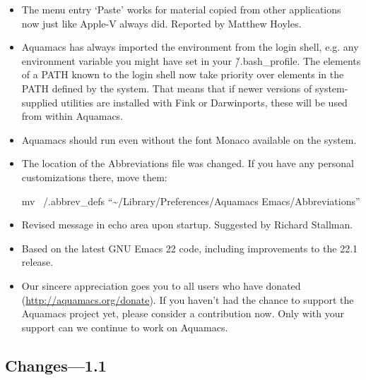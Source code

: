 \begin{itemize}
\item The menu entry `Paste' works for material copied from other
  applications now just like Apple-V always did. 
Reported by Matthew Hoyles.

\item Aquamacs has always imported the environment from the login
  shell, e.g. any environment variable you might have set in your
  \~/.bash\_profile. The elements of a PATH known to the login shell now
  take priority over elements in the PATH defined by the system. That
  means that if newer versions of system-supplied utilities are
  installed with Fink or Darwinports, these will be used from within
  Aquamacs.

\item Aquamacs should run even without the font Monaco available on the system.

\item The location of the Abbreviations file was changed. If you have any personal customizations there, move them:

mv ~/.abbrev\_defs ``{\textasciitilde{}}/Library/Preferences/Aquamacs Emacs/Abbreviations''

\item Revised message in echo area upon startup.
Suggested by Richard Stallman.

\item Based on the latest GNU Emacs 22 code, including improvements to
  the 22.1 release.


\item Our sincere appreciation goes you to all users who have donated
        (\url{http://aquamacs.org/donate}). If you haven't had the
        chance to support the Aquamacs project yet, please consider a
        contribution now. Only with your support can we continue to
        work on Aquamacs.

\end{itemize}

\subsection{Changes---1.1}

